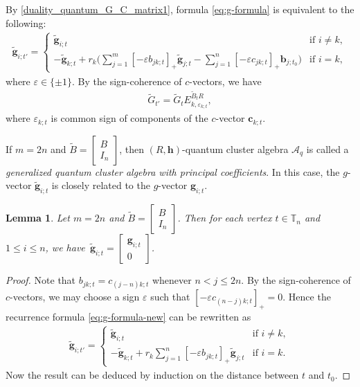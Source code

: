 \documentclass[10pt,a4paper]{amsart}
\numberwithin{equation}{section}
\newtheorem{Lemma}[Theorem]{Lemma}
\begin{document}
By \eqref{duality_quantum_G_C_matrix1}, formula \eqref{eq:g-formula} is equivalent to the following:
 \begin{align}\label{eq:g-formula-new}
 \mathbf{\tilde{g}}_{i;t'}=
 \begin{cases}
 \mathbf{\tilde{g}}_{i;t} & \text{if } i\neq k,\\
 \displaystyle -\mathbf{\tilde{g}}_{k;t}+r_{k}\biggl(\sum\limits_{j=1}^{m}[-\varepsilon b_{jk;t}]_+\mathbf{\tilde{g}}_{j;t}-\sum\limits_{j=1}^{n}[-\varepsilon c_{jk;t}]_+\mathbf{b}_{j;t_0}\biggr) & \text{if }i=k,
 \end{cases}
 \end{align}
 where $\varepsilon\in\{\pm 1\}$.
By the sign-coherence of $c$-vectors, we have
\begin{align}\label{eq:g-matrix}
 \tilde{G}_{t'}=\tilde{G}_{t}E_{k,\varepsilon_{k;t}}^{\tilde{B}_{t}R},
\end{align}
where $\varepsilon_{k;t}$ is common sign of components of the $c$-vector $\mathbf{c}_{k;t}$.

If $m=2n$ and $\tilde{B}=\left[\begin{smallmatrix}
 B\\ I_n
 \end{smallmatrix}\right]$, then $(R,\mathbf{h})$-quantum cluster algebra $\mathcal{A}_q$ is called a {\it generalized quantum cluster algebra with principal coefficients}. In this case, the $g$-vector $\tilde{\mathbf{g}}_{i;t}$ is closely related to the $g$-vector $\mathbf{g}_{i;t}$.
\begin{Lemma}\label{l:g-vector-comparison}
 Let $m=2n$ and $\tilde{B}=\left[\begin{smallmatrix}
 B\\ I_n
 \end{smallmatrix}\right]$. Then for each vertex $t\in \mathbb{T}_n$ and $1\leq i\leq n$, we have~${\tilde{\mathbf{g}}_{i;t}=\left[\begin{smallmatrix}
 \mathbf{g}_{i;t}\\ 0
 \end{smallmatrix}\right]}$.
\end{Lemma}
\begin{proof}
 Note that $b_{jk;t}=c_{(j-n)k;t}$ whenever $n<j\leq 2n$. By the sign-coherence of $c$-vectors, we may choose a sign $\varepsilon$ such that $[-\varepsilon c_{(n-j)k;t}]_+=0$. Hence the recurrence formula \eqref{eq:g-formula-new} can be rewritten as
 \begin{align*}
 \tilde{\mathbf{g}}_{i;t'}= \begin{cases}
 \mathbf{\tilde{g}}_{i;t} & \text{if } i\neq k,\\
 \displaystyle-\mathbf{\tilde{g}}_{k;t}+r_{k}\sum\limits_{j=1}^{n}[-\varepsilon b_{jk;t}]_+\mathbf{\tilde{g}}_{j;t} & \text{if }i=k.
 \end{cases}
 \end{align*}
 Now the result can be deduced by induction on the distance between $t$ and $t_0$.
\end{proof}
\end{document}
